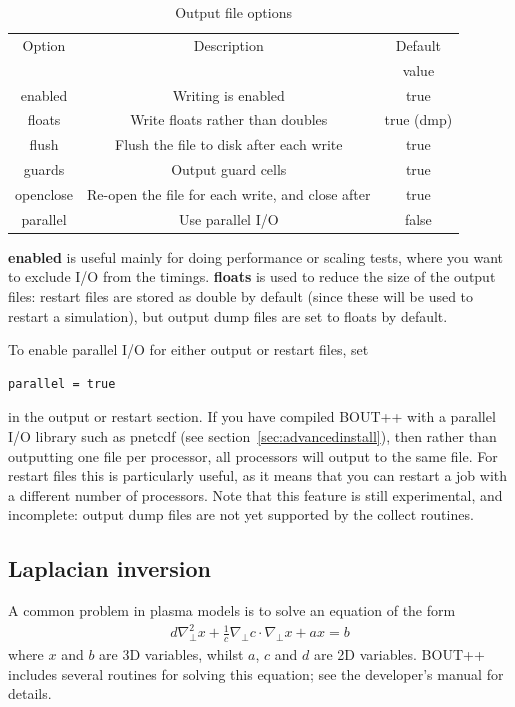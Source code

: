 \documentclass[12pt]{article}
\begin{document}
%
\begin{table}[htb!]
\centering
\caption{Output file options}
%
\label{tab:outputopts}
%
\begin{tabular}{c | c | c}
\hline
Option & Description & Default\\
       &             & value\\
\hline
enabled & Writing is enabled & true \\
floats & Write floats rather than doubles & true (dmp)\\
flush & Flush the file to disk after each write & true \\
guards & Output guard cells & true \\
openclose & Re-open the file for each write, and close after & true \\
parallel & Use parallel I/O & false \\
\hline
\end{tabular}
%
\end{table}
%
{\bf enabled} is useful mainly for doing performance or scaling tests, where
you want to exclude I/O from the timings. {\bf floats} is used to reduce the
size of the output files: restart files are stored as double by default (since
these will be used to restart a simulation), but output dump files are set to
floats by default.

To enable parallel I/O for either output or restart files, set
%
\begin{lstlisting}
parallel = true
\end{lstlisting}
%
in the output or restart section. If you have compiled BOUT++ with a parallel
I/O library such as pnetcdf (see section~\ref{sec:advancedinstall}), then
rather than outputting one file per processor, all processors will output to
the same file. For restart files this is particularly useful, as it means that
you can restart a job with a different number of processors.  Note that this
feature is still experimental, and incomplete: output dump files are not yet
supported by the collect routines.



\subsection{Laplacian inversion}
%
%
A common problem in plasma models is to solve an equation of the form
%
\begin{align}
d\nabla^2_\perp x + \frac{1}{c}\nabla_\perp c\cdot\nabla_\perp x + a x = b
\end{align}
%
where $x$ and $b$ are 3D variables, whilst $a$, $c$ and $d$ are 2D variables.
BOUT++ includes several routines for solving this equation; see the developer's
manual for details.
\end{document}
